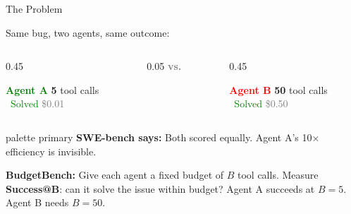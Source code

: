 \documentclass[aspectratio=169, 12pt]{beamer}
\begin{document}
\begin{frame}{The Problem}

\textcolor{grayDark}{Same bug, two agents, same outcome:}

\vspace{0.3cm}
\begin{columns}[T]
  \begin{column}{0.45\textwidth}
    \begin{block}{\textcolor{green}{\textbf{Agent A}}}
      \centering
      {\Huge\textbf{5}} tool calls\\[0.1cm]
      {\small\textcolor{green}{\checkmark~Solved} \hfill \textcolor{gray}{\$0.01}}
    \end{block}
  \end{column}
  \begin{column}{0.05\textwidth}
    \centering\vspace{0.5cm}
    {\large\textcolor{gray}{\textbf{vs.}}}
  \end{column}
  \begin{column}{0.45\textwidth}
    \begin{alertedblock}{\textcolor{red}{\textbf{Agent B}}}
      \centering
      {\Huge\textbf{50}} tool calls\\[0.1cm]
      {\small\textcolor{green}{\checkmark~Solved} \hfill \textcolor{gray}{\$0.50}}
    \end{alertedblock}
  \end{column}
\end{columns}

\vspace{0.4cm}
\begin{beamercolorbox}[wd=\textwidth, rounded=true, sep=6pt]{palette primary}
  \textbf{SWE-bench says:} Both scored equally. Agent A's 10$\times$ efficiency is invisible.
\end{beamercolorbox}

\vspace{0.3cm}
\textcolor{accent}{\textbf{BudgetBench:}} Give each agent a fixed budget of $B$ tool calls. Measure \textbf{Success@B}: can it solve the issue within budget? Agent A succeeds at $B{=}5$. Agent B needs $B{=}50$.

\end{frame}
\end{document}
